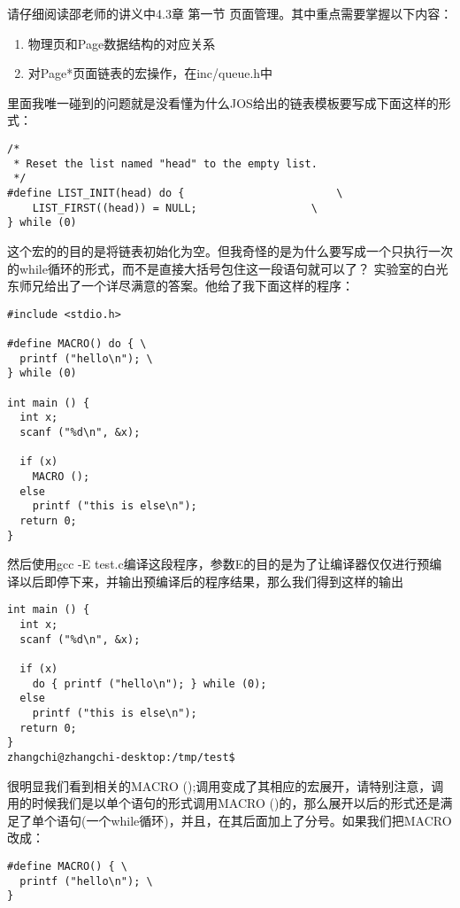 \documentclass{article}
\newcommand{\funcname}[1]{{\ttfamily \small #1}}
\begin{document}
\begin{CJK*}{UTF8}{gkai}
请仔细阅读邵老师的讲义中4.3章 第一节 页面管理。其中重点需要掌握以下内容：

\begin{enumerate}
\item{物理页和Page数据结构的对应关系}
\item{对Page*页面链表的宏操作，在inc/queue.h中}
\end{enumerate}

里面我唯一碰到的问题就是没看懂为什么JOS给出的链表模板要写成下面这样的形式：

\begin{lstlisting}[style=ccode, firstnumber=165, title={\scriptsize \ttfamily \bfseries inc/queue.h}]
/*
 * Reset the list named "head" to the empty list.
 */
#define	LIST_INIT(head) do {						\
	LIST_FIRST((head)) = NULL;					\
} while (0)
\end{lstlisting}

这个宏的的目的是将链表初始化为空。但我奇怪的是为什么要写成一个只执行一次的while循环的形式，而不是直接大括号包住这一段语句就可以了？ 实验室的白光东师兄给出了一个详尽满意的答案。他给了我下面这样的程序：

\begin{lstlisting}[style=ccode, title={\scriptsize \ttfamily \bfseries test.c}]
#include <stdio.h>

#define MACRO() do { \
  printf ("hello\n"); \
} while (0)

int main () {
  int x;
  scanf ("%d\n", &x);

  if (x) 
    MACRO ();
  else
    printf ("this is else\n");
  return 0;
}
\end{lstlisting}

然后使用gcc -E test.c编译这段程序，参数E的目的是为了让编译器仅仅进行预编译以后即停下来，并输出预编译后的程序结果，那么我们得到这样的输出

\begin{lstlisting}[style=console]
int main () {
  int x;
  scanf ("%d\n", &x);

  if (x)
    do { printf ("hello\n"); } while (0);
  else
    printf ("this is else\n");
  return 0;
}
zhangchi@zhangchi-desktop:/tmp/test$ 
\end{lstlisting}

很明显我们看到相关的\funcname{MACRO ();}调用变成了其相应的宏展开，请特别注意，调用的时候我们是以单个语句的形式调用\funcname{MACRO ()}的，那么展开以后的形式还是满足了单个语句(一个while循环)，并且，在其后面加上了分号。如果我们把MACRO改成：

\begin{lstlisting}[style=ccode, title={\scriptsize \ttfamily \bfseries test.c}]
#define MACRO() { \
  printf ("hello\n"); \
}
\end{lstlisting}


\end{CJK*}
\end{document}
